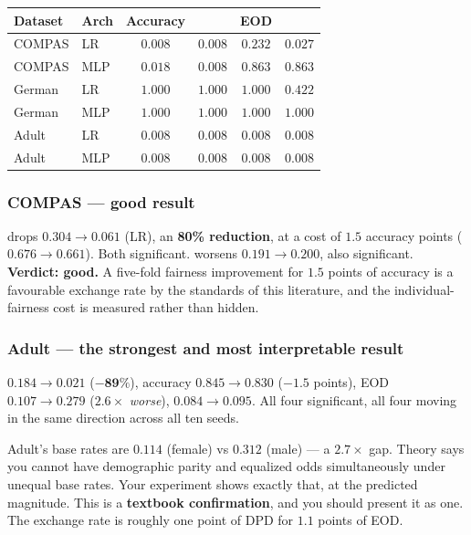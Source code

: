 \begin{center}
\small
\begin{tabular}{@{}llcccc@{}}
\toprule
\textbf{Dataset} & \textbf{Arch} & \textbf{Accuracy} & \textbf{\dpdtwo{}} & \textbf{EOD} & \textbf{\getwo{}} \\
\midrule
COMPAS & LR  & $\mathbf{0.008}$ & $\mathbf{0.008}$ & $0.232$ & $\mathbf{0.027}$ \\
COMPAS & MLP & $\mathbf{0.018}$ & $\mathbf{0.008}$ & $0.863$ & $0.863$ \\
German & LR  & $1.000$ & $1.000$ & $1.000$ & $0.422$ \\
German & MLP & $1.000$ & $1.000$ & $1.000$ & $1.000$ \\
Adult  & LR  & $\mathbf{0.008}$ & $\mathbf{0.008}$ & $\mathbf{0.008}$ & $\mathbf{0.008}$ \\
Adult  & MLP & $\mathbf{0.008}$ & $\mathbf{0.008}$ & $\mathbf{0.008}$ & $\mathbf{0.008}$ \\
\bottomrule
\end{tabular}
\end{center}

\subsubsection{COMPAS --- good result}
\dpdtwo{} drops $0.304 \to 0.061$ (LR), an \textbf{80\% reduction}, at a cost of
$1.5$ accuracy points ($0.676 \to 0.661$). Both significant. \getwo{} worsens
$0.191 \to 0.200$, also significant. \textbf{Verdict: good.} A five-fold
fairness improvement for $1.5$ points of accuracy is a favourable exchange rate
by the standards of this literature, and the individual-fairness cost is
measured rather than hidden.

\subsubsection{Adult --- the strongest and most interpretable result}
\dpdtwo{} $0.184 \to 0.021$ ($\mathbf{-89\%}$), accuracy $0.845 \to 0.830$
($-1.5$ points), EOD $0.107 \to \mathbf{0.279}$ ($2.6\times$ \emph{worse}),
\getwo{} $0.084 \to 0.095$. All four significant, all four moving in the same
direction across all ten seeds.

\begin{keybox}
Adult's base rates are $0.114$ (female) vs $0.312$ (male) --- a $2.7\times$ gap.
Theory says you cannot have demographic parity and equalized odds
simultaneously under unequal base rates. Your experiment shows exactly that, at
the predicted magnitude. This is a \textbf{textbook confirmation}, and you
should present it as one. The exchange rate is roughly one point of DPD for
$1.1$ points of EOD.
\end{keybox}

